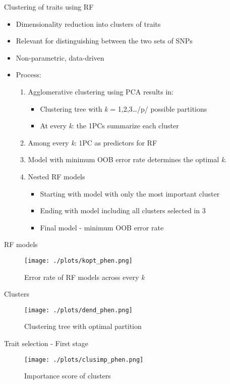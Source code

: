 \documentclass[presentation]{beamer}
\begin{document}
\begin{frame}[label={sec:org7bc231e}]{Clustering of traits using RF}
\begin{itemize}
\item Dimensionality reduction into clusters of traits
\item Relevant for distinguishing between the two sets of SNPs
\item Non-parametric, data-driven
\item Process:
\begin{enumerate}
\item Agglomerative clustering using PCA results in:
\begin{itemize}
\item Clustering tree with \emph{k} = 1,2,3\ldots{}/p/ possible partitions
\item At every \emph{k}: the 1PCs summarize each cluster
\end{itemize}
\item Among every \emph{k}: 1PC as predictors for RF
\item Model with minimum OOB error rate determines the optimal \emph{k}.
\item Nested RF models
\begin{itemize}
\item Starting with model with only the most important cluster
\item Ending with model including all clusters selected in \alert{3}
\item Final model - minimum OOB error rate
\end{itemize}
\end{enumerate}
\end{itemize}
\end{frame}
\begin{frame}[label={sec:orgded19a8}]{RF models}
\begin{figure}[htbp]
\centering
\texttt{[image: ./plots/kopt\_phen.png]}
\caption[\emph{k}]{Error rate of RF models across every \emph{k}}
\end{figure}
\end{frame}
\begin{frame}[label={sec:org7b7370c}]{Clusters}
\begin{figure}[htbp]
\centering
\texttt{[image: ./plots/dend\_phen.png]}
\caption{Clustering tree with optimal partition}
\end{figure}
\end{frame}
\begin{frame}[label={sec:org85416ae}]{Trait selection - First stage}
\begin{figure}[htbp]
\centering
\texttt{[image: ./plots/clusimp\_phen.png]}
\caption{Importance score of clusters}
\end{figure}
\end{frame}
\end{document}
